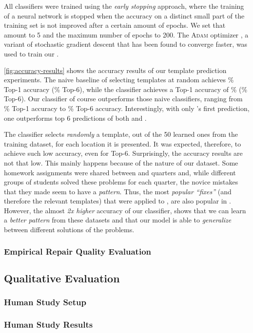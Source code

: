 All classifiers were trained using the \emph{early stopping} approach, where the
training of a neural network is stopped when the accuracy on a distinct small
part of the training set is not improved after a certain amount of epochs. We
set that amount to 5 and the maximum number of epochs to 200. The \textsc{Adam}
optimizer \citep{Kingma2014-ng}, a variant of stochastic gradient descent that
has been found to converge faster, was used to train our \dnn.



\autoref{fig:accuracy-results} shows the accuracy results of our template
prediction experiments. The naive baseline of selecting templates at random
achieves \RandomTopOne\% Top-1 accuracy (\RandomTopSix\% Top-6), while the
\popular classifier achieves a Top-1 accuracy of \PopularTopOne\%
(\PopularTopSix\% Top-6). Our \dnn classifier of course outperforms those naive
classifiers, ranging from \DnnTopOne\% Top-1 accuracy to \DnnTopSix\% Top-6
accuracy. Interestingly, with only \dnn's first prediction, one outperforms top
6 predictions of both \random and \popular.

The \random classifier selects \emph{randomly} a template, out of the 50 learned
ones from the \SPRING training dataset, for each location it is presented. It
was expected, therefore, to achieve such low accuracy, even for Top-6.
Surprisingly, the \popular accuracy results are not that low. This mainly
happens because of the nature of our dataset. Some homework assignments were
shared between \SPRING and \FALL quarters and, while different groups of
students solved these problems for each quarter, the novice mistakes that they
made seem to have a \emph{pattern}. Thus, the most \emph{popular ``fixes''} (and
therefore the relevant templates) that were applied to \SPRING, are also popular
in \FALL. However, the almost \emph{2x higher} accuracy of our \dnn classifier,
shows that we can learn a \emph{better pattern} from these datasets and that our
\dnn model is able to \emph{generalize} between different solutions of the
problems.


\subsubsection{Empirical Repair Quality Evaluation}
\label{subsubsec:man_rep_qual_eval}



\subsection{Qualitative Evaluation}
\label{subsec:quan_eval}

\subsubsection{Human Study Setup}
\label{subsubsec:study_setup}


\subsubsection{Human Study Results}
\label{subsubsec:study_res}
